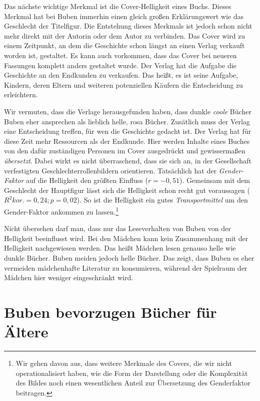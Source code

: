 Das nächste wichtige Merkmal ist die Cover-Helligkeit eines Buchs.
Dieses Merkmal hat bei Buben immerhin einen gleich großen Erklärungswert
wie das Geschlecht der Titelfigur. Die Entstehung dieses Merkmals ist
jedoch schon nicht mehr direkt mit der Autorin oder dem Autor zu
verbinden. Das Cover wird zu einem Zeitpunkt, an dem die Geschichte
schon längst an einen Verlag verkauft worden ist, gestaltet. Es kann
auch vorkommen, dass das Cover bei neueren Fassungen komplett anders
gestaltet wurde. Der Verlag hat die Aufgabe die Geschichte an den
Endkunden zu verkaufen. Das heißt, es ist seine Aufgabe, Kindern, deren
Eltern und weiteren potenziellen Käufern die Entscheidung zu
erleichtern.

Wir vermuten, dass die Verlage herausgefunden haben, dass dunkle
\emph{coole} Bücher Buben eher ansprechen als lieblich helle, rosa
Bücher. Zusätlich muss der Verlag eine Entscheidung treffen, für wen die
Geschichte gedacht ist. Der Verlag hat für diese Zeit mehr Ressourcen
als der Endkunde. Hier werden Inhalte eines Buches von den dafür
zuständigen Personen im Cover ausgedrückt und gewissermaßen
\emph{übersetzt}. Dabei wirkt es nicht überraschend, dass sie sich an,
in der Gesellschaft verfestigten Geschlechterrollenbildern orientieren.
Tatsächlich hat der \emph{Gender-Faktor} auf die Helligkeit den größten
Einfluss ($r=-0{,}51$). Gemeinsam mit dem Geschlecht der Hauptfigur
lässt sich die Helligkeit schon recht gut voraussagen
($R^2 \scriptstyle kor.\textstyle =0{,}24; p=0{,}02$). So ist die
Helligkeit ein gutes \emph{Transportmittel} um den Gender-Faktor
ankommen zu
lassen.\footnote{Wir gehen davon aus, dass weitere Merkmale des Covers, die wir nicht operationalisiert haben, wie die Form der Darstellung oder die Komplexität des Bildes noch einen wesentlichen Anteil zur Übersetzung des Genderfaktor beitragen.}

Nicht übersehen darf man, dass nur das Leseverhalten von Buben von der
Helligkeit beeinflusst wird. Bei den Mädchen kann kein Zusammenhang mit
der Helligkeit nachgewiesen werden. Das heißt Mädchen lesen genauso
helle wie dunkle Bücher. Buben meiden jedoch helle Bücher. Das zeigt,
dass Buben es eher vermeiden mädchenhafte Literatur zu konsumieren,
während der Spielraum der Mädchen hier weniger eingeschränkt wird.

\section{Buben bevorzugen Bücher für Ältere}

